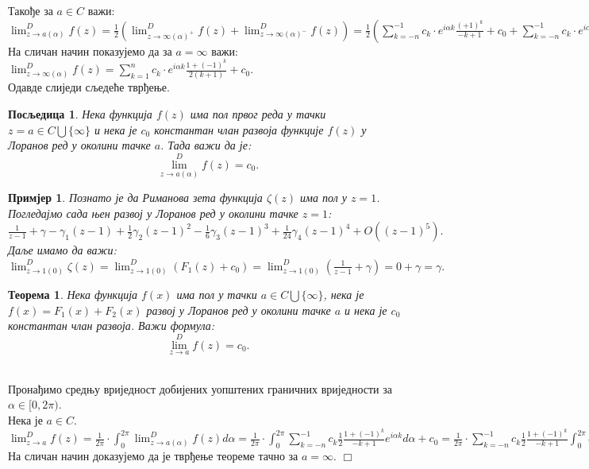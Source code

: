 \documentclass[12pt]{article}
\newtheorem{theorem}{Теорема}
\newtheorem{corollary}{Посљедица}
\newtheorem{example}{Примјер}
\newenvironment{proof}{\noindent {\sc Доказ:}}{$\Box$ \medskip}
\begin{document}
Такође за $a\in C$ важи:\\
$\lim^D_{z\to a(\alpha)}f(z)=\frac{1}{2}(\lim^D_{z\to\infty(\alpha)^+}f(z)+\lim^D_{z\to\infty(\alpha)^-}f(z))=\frac{1}{2}(\sum_{k=-n}^{-1} c_{k}\cdot e^{i\alpha k}\frac{(+1)^k}{-k+1}+c_0+\sum_{k=-n}^{-1} c_{k}\cdot e^{i\alpha k}\frac{(-1)^k}{-k+1}+c_0)=\sum_{k=-n}^{-1} c_{k}\cdot e^{i\alpha k}\frac{1+(-1)^k}{2(-k+1)}+c_0.$\\
На сличан начин показујемо да за $a=\infty$ важи:\\ 
$\lim^D_{z\to \infty(\alpha)}f(z)=\sum_{k=1}^n c_k\cdot e^{i\alpha k}\frac{1+(-1)^k}{2(k+1)}+c_0$.\\ 
Одавде слиједи сљедеће тврђење.

\begin{corollary}
Нека функција $f(z)$ има пол првог реда у тачки $z=a\in C\bigcup \{\infty\}$ и нека је $c_0$ константан члан развоја функције $f(z)$ у Лоранов ред у околини тачке $a$. Тада важи да је: $$\lim^D_{z\to a(\alpha)}f(z)=c_0.$$
\end{corollary}

\begin{example}
Познато је да Риманова зета функција $\zeta(z)$ има пол у $z=1$. Погледајмо сада њен развој у Лоранов ред у околини тачке $z=1$:\\
$\frac{1}{z-1}+\gamma-\gamma _1 (z-1)+\frac{1}{2} \gamma _2(z-1)^2-\frac{1}{6} \gamma _3 (z-1)^3+\frac{1}{24} \gamma _4 (z-1)^4+O((z-1)^5).$\\
Даље имамо да важи:\\ 
$\lim^D_{z\to 1(0)}\zeta(z)=\lim^D_{z\to 1(0)}(F_1(z)+c_0)=\lim^D_{z\to 1(0)}(\frac{1}{z-1}+\gamma)=0+\gamma=\gamma.$
\end{example}

\begin{theorem}
Нека функција $f(x)$ има пол у тачки $a\in C\bigcup \{\infty\}$, нека је $f(x)=F_1(x)+F_2(x)$ развој у Лоранов ред у околини тачке $a$ и нека је $c_0$ константан члан развоја. Важи формула: $$\lim^D_{z\to a}f(z)=c_0.$$\\
\end{theorem}

\begin{proof}
Пронађимо средњу вриједност добијених уопштених граничних вриједности за $\alpha\in[0,2\pi)$.\\
Нека је $a\in C$.\\
$\lim^D_{z\to a}f(z)=\frac{1}{2\pi}\cdot\int_0^{2\pi}\lim^D_{z\to a(\alpha)}f(z)d\alpha=\frac{1}{2\pi}\cdot\int_0^{2\pi}\sum_{k=-n}^{-1} c_k \frac{1}{2}\frac{1+(-1)^k}{-k+1} e^{i\alpha k}d\alpha+c_0=\frac{1}{2\pi}\cdot\sum_{k=-n}^{-1} c_k \frac{1}{2}\frac{1+(-1)^k}{-k+1} \int_0^{2\pi}e^{i\alpha k}d\alpha+c_0=0+c_0=c_0.$\\
На сличан начин доказујемо да је тврђење теореме тачно за $a=\infty$.
\end{proof}
\end{document}
